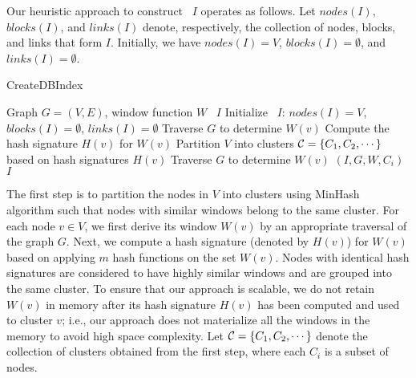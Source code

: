 Our heuristic approach to construct \DBIndex\ $I$ operates as follows.
Let $nodes(I)$, $blocks(I)$, and $links(I)$ denote, respectively,
the collection of nodes, blocks, and links that form $I$.
Initially, we have $nodes(I) = V$,
$blocks(I) = \emptyset$,
and
$links(I) = \emptyset$.
\begin{algorithm}
\caption{CreateDBIndex}
\begin{algorithmic}[1]  \small
\Require Graph $G=(V,E)$, window function $W$
\Ensure \DBIndex\ $I$
\State Initialize \DBIndex\ $I$: $nodes(I)=V$, $blocks(I)=\emptyset$, $links(I)=\emptyset$
	\State Traverse $G$ to determine $W(v)$
	\State Compute the hash signature $H(v)$ for $W(v)$
\EndFor
\State Partition $V$ into clusters ${\cal C} = \{C_1,C_2,\cdots\}$ based on hash signatures $H(v)$
		\State Traverse $G$ to determine $W(v)$
	\EndFor
	 $(I,G,W,C_i)$
\EndFor
\Return $I$
\end{algorithmic}
\label{algo:k-hop-dbi}
\end{algorithm}

The first step is to partition the nodes in $V$ into clusters
using MinHash algorithm such that nodes with similar windows belong to the same cluster. 
For each node $v \in V$, we first derive its window $W(v)$ by an appropriate traversal of the graph $G$.
Next, we compute a hash signature (denoted by $H(v)$) for $W(v)$ based on applying $m$ hash functions on the set $W(v)$.
Nodes with identical hash signatures are considered to have highly similar windows and are grouped into the same cluster.
To ensure that our approach is scalable,
we do not retain $W(v)$ in memory  after its hash signature $H(v)$ has been computed and used to cluster $v$;
i.e., our approach does not materialize all the windows in the memory to avoid high space complexity.
Let ${\cal C} = \{C_1,C_2,\cdots\}$ denote the collection of clusters obtained from the first step,
where each $C_i$ is a subset of nodes.


